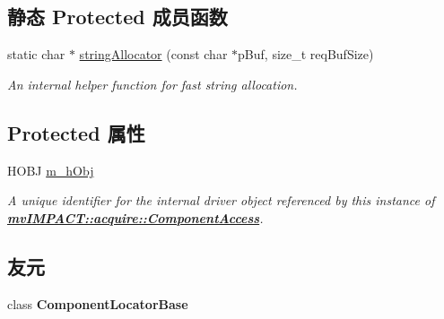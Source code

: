 \subsection*{静态 Protected 成员函数}
\begin{DoxyCompactItemize}
\item 
\hypertarget{classmv_i_m_p_a_c_t_1_1acquire_1_1_component_access_a756900b648d65f8a20ded09ff4e5792d}{static char $\ast$ \hyperlink{classmv_i_m_p_a_c_t_1_1acquire_1_1_component_access_a756900b648d65f8a20ded09ff4e5792d}{string\+Allocator} (const char $\ast$p\+Buf, size\+\_\+t req\+Buf\+Size)}\label{classmv_i_m_p_a_c_t_1_1acquire_1_1_component_access_a756900b648d65f8a20ded09ff4e5792d}

\begin{DoxyCompactList}\small\item\em An internal helper function for fast string allocation. \end{DoxyCompactList}\end{DoxyCompactItemize}
\subsection*{Protected 属性}
\begin{DoxyCompactItemize}
\item 
\hypertarget{classmv_i_m_p_a_c_t_1_1acquire_1_1_component_access_a5ec5805e15290fcc78cf51bf0c0b5306}{H\+O\+B\+J \hyperlink{classmv_i_m_p_a_c_t_1_1acquire_1_1_component_access_a5ec5805e15290fcc78cf51bf0c0b5306}{m\+\_\+h\+Obj}}\label{classmv_i_m_p_a_c_t_1_1acquire_1_1_component_access_a5ec5805e15290fcc78cf51bf0c0b5306}

\begin{DoxyCompactList}\small\item\em A unique identifier for the internal driver object referenced by this instance of {\bfseries \hyperlink{classmv_i_m_p_a_c_t_1_1acquire_1_1_component_access}{mv\+I\+M\+P\+A\+C\+T\+::acquire\+::\+Component\+Access}}. \end{DoxyCompactList}\end{DoxyCompactItemize}
\subsection*{友元}
\begin{DoxyCompactItemize}
\item 
\hypertarget{classmv_i_m_p_a_c_t_1_1acquire_1_1_component_access_a88d25bfdac9630547966fdf23b7a7d27}{class {\bfseries Component\+Locator\+Base}}\label{classmv_i_m_p_a_c_t_1_1acquire_1_1_component_access_a88d25bfdac9630547966fdf23b7a7d27}

\end{DoxyCompactItemize}


